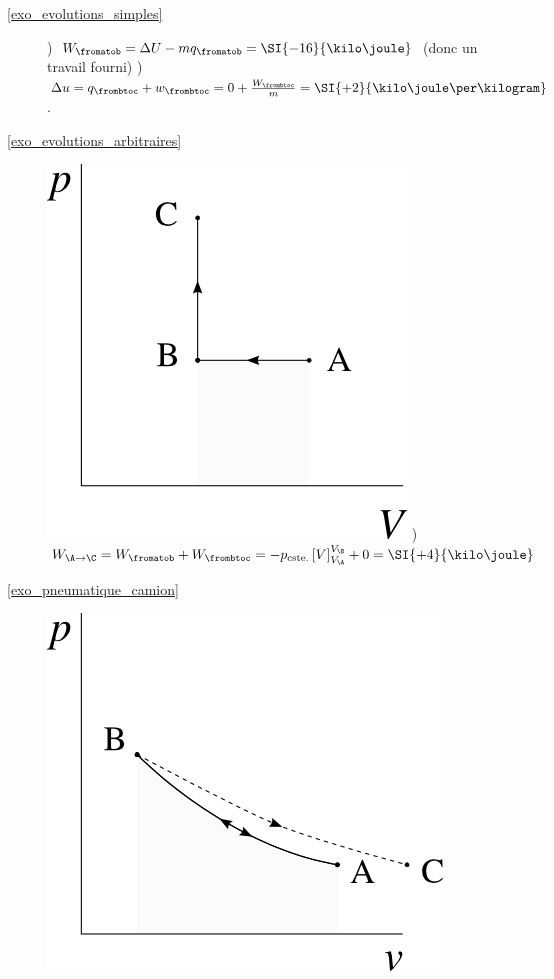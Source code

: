 \begin{description}
	\item [\ref{exo_evolutions_simples}]
					) $W_\fromatob = \Delta U - m q_\fromatob = \SI{-16}{\kilo\joule}$ (donc un travail fourni)
					) $\Delta u = q_\frombtoc + w_\frombtoc =  0 + \frac{W_\frombtoc}{m} = \SI{+2}{\kilo\joule\per\kilogram}$.
	\item [\ref{exo_evolutions_arbitraires}]
					\includegraphics[width=\solutiondiagramwidth]{images/exo_pv_1.png}
					) $W_{\A\to\C} = W_\fromatob + W_\frombtoc = -p_{\text{cste.}} \left[V\right]_{V_\A}^{V_\B } + 0 = \SI{+4}{\kilo\joule}$
	\item [\ref{exo_pneumatique_camion}]
					\includegraphics[width=\solutiondiagramwidth]{images/exo_pv_camion.png}

\end{description}
